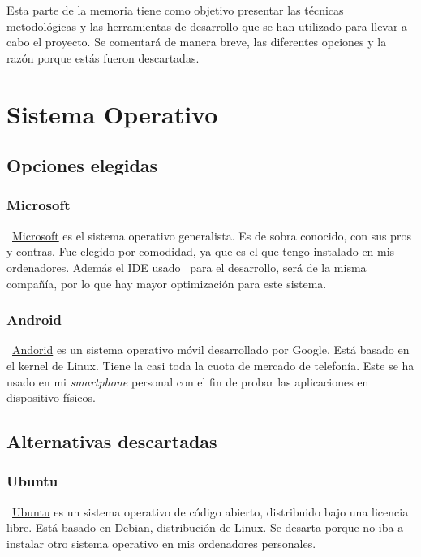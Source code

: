 
Esta parte de la memoria tiene como objetivo presentar las técnicas metodológicas y las herramientas de desarrollo que se han utilizado para llevar a cabo el proyecto. Se comentará de manera breve, las diferentes opciones y la razón porque estás fueron descartadas.

\section{Sistema Operativo}

\subsection{Opciones elegidas}

\subsubsection{Microsoft}
~\href{https://www.microsoft.com/es-es}{Microsoft} es el sistema operativo generalista. Es de sobra conocido, con sus pros y contras. Fue elegido por comodidad, ya que es el que tengo instalado en mis ordenadores. Además el IDE usado~\pageref{visual} para el desarrollo, será de la misma compañía, por lo que hay mayor optimización para este sistema.

\subsubsection{Android}
~\href{https://www.android.com/intl/es_es/}{Andorid} es un sistema operativo móvil desarrollado por Google. Está basado en el kernel de Linux. Tiene la casi toda la cuota de mercado de telefonía. Este se ha usado en mi \emph{smartphone} personal con el fin de probar las aplicaciones en dispositivo físicos.

\subsection{Alternativas descartadas}

\subsubsection{Ubuntu}
~\href{https://ubuntu.com/}{Ubuntu} es un sistema operativo de código abierto, distribuido bajo una licencia libre. Está basado en Debian, distribución de Linux. Se desarta porque no iba a instalar otro sistema operativo en mis ordenadores personales.


